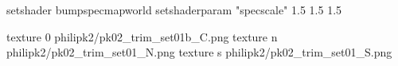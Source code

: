 setshader bumpspecmapworld
setshaderparam "specscale" 1.5 1.5 1.5

texture 0 philipk2/pk02_trim_set01b_C.png
texture n philipk2/pk02_trim_set01_N.png
texture s philipk2/pk02_trim_set01_S.png

